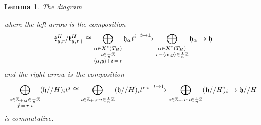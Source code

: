 \documentclass[12pt]{article}
\newtheorem{lemma}[theorem]{Lemma}
\theoremstyle{remark}
\begin{document}
\begin{lemma}\label{qxrdescription}
The diagram
\begin{center}
\end{center}
where the left arrow is the composition
\[
\mathfrak{k}_{y,r}^H/\mathfrak{k}_{y,r+}^H\cong\displaystyle\bigoplus_{\substack{\alpha\in X^*(T_H)\\ i\in\frac{1}{n}\mathbb{Z} \\ \langle\alpha,y\rangle+i\thinspace=\thinspace r}}\mathfrak{h}_{\alpha}t^i \xrightarrow{t\mapsto 1}\displaystyle\bigoplus_{\substack{\alpha\in X^*(T_H)\\ r-\langle\alpha,y\rangle\in\frac{1}{n}\mathbb{Z}}}\mathfrak{h}_{\alpha}\rightarrow\mathfrak{h}
\]
and the right arrow is the composition
\[
\displaystyle\bigoplus_{\substack{i\in\mathbb{Z}_+,j\in\frac{1}{n}\mathbb{Z}\\ j\thinspace=\thinspace r\cdot i}}(\mathfrak{h}//H)_it^j\cong\displaystyle\bigoplus_{\substack{i\in\mathbb{Z}_+,r\cdot i\in\frac{1}{n}\mathbb{Z}}}(\mathfrak{h}//H)_it^{r\cdot i}\xrightarrow{t\mapsto 1}\displaystyle\bigoplus_{\substack{i\in\mathbb{Z}_+,r\cdot i\in\frac{1}{n}\mathbb{Z}}}(\mathfrak{h}//H)_i\rightarrow\mathfrak{h}//H
\]
is commutative.
\end{lemma}
\end{document}
